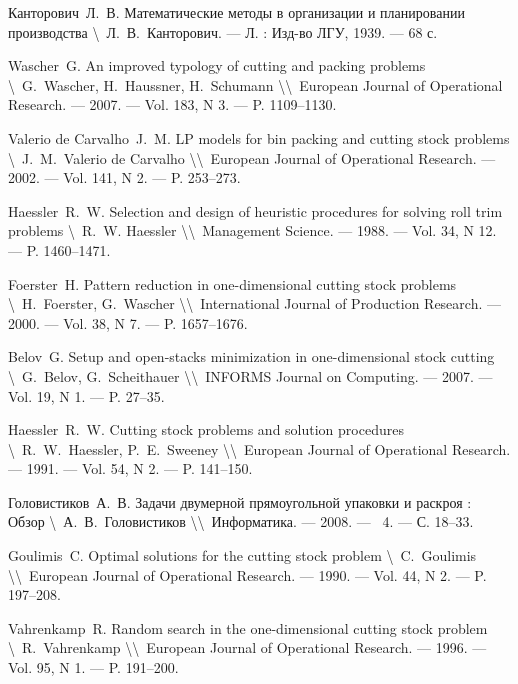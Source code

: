 \documentclass[12pt]{article}
\begin{document}
\begin{thebibliography}{00}
 Канторович~Л.~В. Математические методы в организации и 
планировании производства 
\textbackslash~Л.~В.~Канторович. --- Л. : Изд-во ЛГУ, 1939. --- 68 с.    

 Wascher~G. An improved typology of cutting and packing 
problems 
\textbackslash~G.~Wascher, H.~Haussner, H.~Schumann 
\textbackslash\textbackslash~European Journal of Operational Research. 
--- 2007. --- Vol. 183, N 3. --- P. 1109--1130.

 Valerio de Carvalho~J.~M. LP models for bin packing and 
cutting stock problems
\textbackslash~J.~M.~Valerio de Carvalho 
\textbackslash\textbackslash~European Journal of Operational Research. 
--- 2002. --- Vol. 141, N 2. --- P. 253--273.

 Haessler~R.~W. Selection and design of heuristic 
procedures for solving roll trim problems 
\textbackslash~R.~W. Haessler 
\textbackslash\textbackslash~Management Science. 
--- 1988. --- Vol. 34, N 12. --- P. 1460--1471.

 Foerster~H. Pattern reduction in one-dimensional cutting 
stock problems 
\textbackslash~H.~Foerster, G.~Wascher 
\textbackslash\textbackslash~International Journal of Production Research. 
--- 2000. --- Vol. 38, N 7. --- P. 1657--1676.

 Belov~G. Setup and open-stacks minimization in 
one-dimensional stock cutting 
\textbackslash~G.~Belov, G.~Scheithauer 
\textbackslash\textbackslash~INFORMS Journal on Computing. 
--- 2007. --- Vol. 19, N 1. --- P. 27--35.

 Haessler~R.~W. Cutting stock problems and solution 
procedures 
\textbackslash~R.~W.~Haessler, P.~E.~Sweeney 
\textbackslash\textbackslash~European Journal of Operational Research. 
--- 1991. --- Vol. 54, N 2. --- P. 141--150.

 Головистиков~А.~В. Задачи двумерной прямоугольной 
упаковки и раскроя : Обзор 
\textbackslash~А.~В.~Головистиков 
\textbackslash\textbackslash~Информатика. --- 2008. --- \No~4. --- С. 18--33.

 Goulimis~C. Optimal solutions for the cutting stock problem 
\textbackslash~C.~Goulimis 
\textbackslash\textbackslash~European Journal of Operational Research. 
--- 1990. --- Vol. 44, N 2. --- P. 197--208.

 Vahrenkamp~R. Random search in the one-dimensional 
cutting stock problem
\textbackslash~R.~Vahrenkamp 
\textbackslash\textbackslash~European Journal of Operational Research. 
--- 1996. --- Vol. 95, N 1. --- P. 191--200.


\end{thebibliography}
\end{document}
